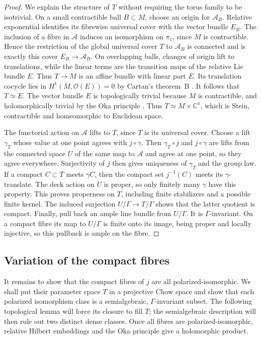 \begin{proof}
We explain the structure of $T$ without requiring the torus family
to be isotrivial.  On a small contractible ball $B\subset M$, choose
an origin for $\mathcal A_B$.  Relative exponential identifies its
fibrewise universal cover with the vector bundle $E_B$.  The inclusion
of a fibre in $\mathcal A$ induces an isomorphism on $\pi_1$, since
$M$ is contractible.  Hence the restriction of the global universal
cover $T$ to $\mathcal A_B$ is connected and is exactly this cover
$E_B\to\mathcal A_B$.  On overlapping balls, changes of origin lift
to translations, while the linear terms are the transition maps of
the relative Lie bundle $E$.  Thus $T\to M$ is an affine bundle with
linear part $E$.  Its translation cocycle lies in
$H^1(M,\mathcal O(E))=0$ by Cartan's theorem~B
\cite[Expos\'e~18, \S4]{Cartan1952}.  It follows that
$T\simeq E$.  The vector bundle $E$ is topologically trivial because
$M$ is contractible, and holomorphically trivial by the Oka principle
\cite{Grauert1958,ForstnericPrezelj2000}.
Thus $T\simeq M\times\mathbb C^a$, which is Stein, contractible and
homeomorphic to Euclidean space.

\enlargethispage{\baselineskip}
The functorial action on $\mathcal A$ lifts to $T$, since $T$ is its
universal cover.  Choose a lift $\gamma_T$ whose value at one point
agrees with $j\circ\gamma$.  Then $\gamma_T\circ j$ and
$j\circ\gamma$ are lifts from the connected space $U$ of the same
map to $\mathcal A$ and agree at one point, so they agree everywhere.
Surjectivity of $j$ then gives uniqueness of $\gamma_T$ and the
group law.  If a compact
$C\subset T$ meets $\gamma C$, then the compact set $j^{-1}(C)$ meets
its $\gamma$-translate.  The deck action on $U$ is proper, so only
finitely many $\gamma$ have this property.  This proves properness
on $T$, including finite stabilizers and a possible finite kernel.
The induced surjection $U/\Gamma\to T/\Gamma$ shows that the latter
quotient is compact.  Finally, pull back an ample line bundle from
$U/\Gamma$.  It is $\Gamma$-invariant.  On a compact fibre its map to
$U/\Gamma$ is finite onto its image, being proper and locally
injective, so this pullback is ample on the fibre.
\end{proof}

\subsection{Variation of the compact fibres}

It remains to show that the compact fibres of $j$ are all
polarized-isomorphic.  We shall put their parameter space $T$ in a
projective Chow space and show that each polarized isomorphism class
is a semialgebraic, $\Gamma$-invariant subset.  The following
topological lemma will force its closure to fill $T$; the
semialgebraic description will then rule out two distinct dense
classes.  Once all fibres are polarized-isomorphic, relative Hilbert
embeddings and the Oka principle give a holomorphic product.

